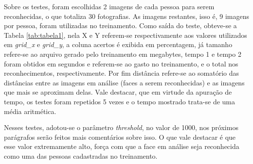 Sobre os testes, foram escolhidas 2 imagens de cada pessoa para serem reconhecidas, o que totaliza 30 fotografias. As imagens restantes, isso é, 9 imagens por pessoa, foram utilizadas no treinamento. Como saída do teste, obteve-se a Tabela \ref{tab:tabela1}, nela X e Y referem-se respectivamente aos valores utilizados em \textit{grid\_x} e \textit{grid\_y},  a coluna acertos é exibida em percentagem, já tamanho refere-se ao arquivo gerado pelo treinamento em megabytes, tempo 1 e tempo 2 foram obtidos em segundos e referem-se ao gasto no treinamento, e o total nos reconhecimentos, respectivamente. Por fim  distância refere-se ao somatório das distâncias entre as imagens em análise (faces a serem reconhecidas) e as imagens que mais se aproximam delas. Vale destacar, que em virtude da apuração de tempo, os testes foram repetidos 5 vezes e o tempo mostrado trata-se de uma média aritmética.

Nesses testes, adotou-se o parâmetro \textit{threshold}, no valor de 1000, nos próximos parágrafos serão feitos mais comentários sobre isso. O que vale destacar é que esse valor extremamente alto, força com que a face em análise seja reconhecida como uma das pessoas cadastradas no treinamento.        



